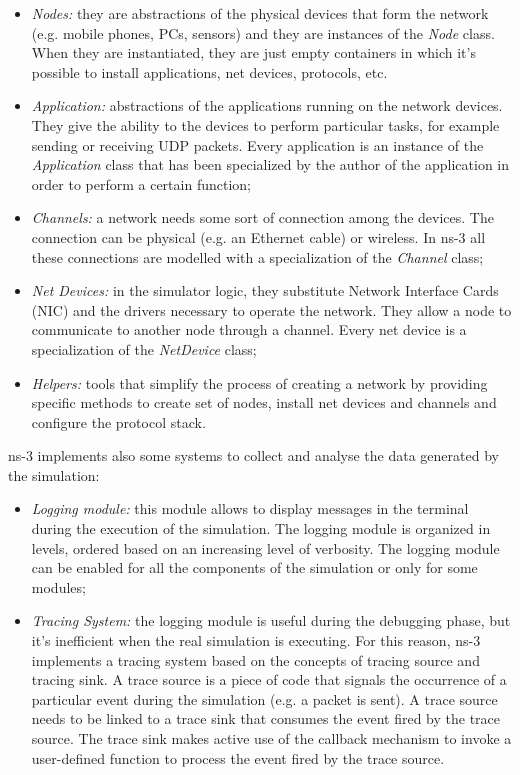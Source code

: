 \begin{itemize}
	\item \textit{Nodes:} they are abstractions of the physical devices that form the network (e.g. mobile phones, PCs, sensors) and they are instances of the \textit{Node} class. When they are instantiated, they are just empty containers in which it's possible to install applications, net devices, protocols, etc.
	
	\item \textit{Application:} abstractions of the applications running on the network devices. They give the ability to the devices to perform particular tasks, for example sending or receiving UDP packets. Every application is an instance of the \textit{Application} class that has been specialized by the author of the application in order to perform a certain function;
	
	\item \textit{Channels:} a network needs some sort of connection among the devices. The connection can be physical (e.g. an Ethernet cable) or wireless. In ns-3 all these connections are modelled with a specialization of the \textit{Channel} class;
	
	\item \textit{Net Devices:} in the simulator logic, they substitute Network Interface Cards (NIC) and the drivers necessary to operate the network. They allow a node to communicate to another node through a channel. Every net device is a specialization of the \textit{NetDevice} class;
	
	\item \textit{Helpers:} tools that simplify the process of creating a network by providing specific methods to create set of nodes, install net devices and channels and configure the protocol stack.
	
\end{itemize}

ns-3 implements also some systems to collect and analyse the data generated by the simulation:

\begin{itemize}
 \item \textit{Logging module:} this module allows to display messages in the terminal during the execution of the simulation. The logging module is organized in levels, ordered based on an increasing level of verbosity. The logging module can be enabled for all the components of the simulation or only for some modules;
 \item \textit{Tracing System:} the logging module is useful during the debugging phase, but it's inefficient when the real simulation is executing. For this reason, ns-3 implements a tracing system based on the concepts of tracing source and tracing sink. A trace source is a piece of code that signals the occurrence of a particular event during the simulation (e.g. a packet is sent). A trace source needs to be linked to a trace sink that consumes the event fired by the trace source. The trace sink makes active use of the callback mechanism to invoke a user-defined function to process the event fired by the trace source.
\end{itemize}
  
